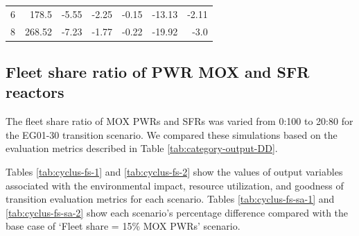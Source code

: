 \begin{table}[]
\begin{tabularx}{\textwidth}{R|RRRRRR}
6  & 178.5            & -5.55                          & -2.25         & -0.15                       & -13.13            & -2.11                           \\
8  & 268.52           & -7.23                          & -1.77         & -0.22                       & -19.92            & -3.0                           \\ \hline
        \end{tabularx}
        \end{table}

\subsection{Fleet share ratio of PWR MOX and SFR reactors}

The fleet share ratio of \gls{MOX} \glspl{PWR} and \glspl{SFR}
was varied from 0:100 to 20:80 for the 
\Cyclus EG01-30 transition scenario. 
We compared these simulations based on the evaluation 
metrics described in Table \ref{tab:category-output-DD}. 

Tables \ref{tab:cyclus-fs-1} and \ref{tab:cyclus-fs-2} show 
the values of 
output variables associated with the environmental impact, 
resource utilization, and goodness of transition evaluation 
metrics for each scenario. 
Tables \ref{tab:cyclus-fs-sa-1} and \ref{tab:cyclus-fs-sa-2} 
show each scenario's percentage 
difference compared with the base case of `Fleet share = 15\% 
\gls{MOX} \glspl{PWR}' scenario. 

